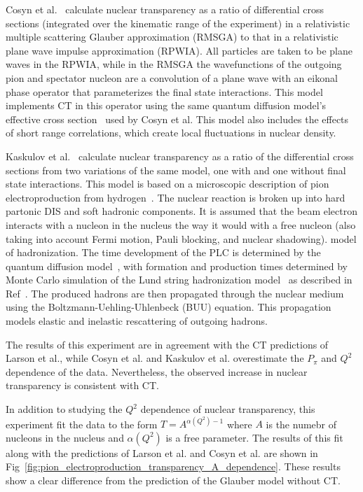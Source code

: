 Cosyn et al.~\cite{Cosyn_2008} calculate nuclear transparency as a ratio of
differential cross sections (integrated over the kinematic range of the
experiment) in a relativistic multiple scattering Glauber approximation (RMSGA)
to that in a relativistic plane wave impulse approximation (RPWIA).
All particles are taken to be plane waves in the RPWIA, while in the RMSGA
the wavefunctions of the outgoing pion and spectator nucleon are a convolution
of a plane wave with an eikonal phase operator that parameterizes the final
state interactions.
This model implements CT in this operator using the same quantum
diffusion model's effective cross section~\cite{Farrar_1988} used by Cosyn et
al.
This model also includes the effects of short range correlations, which create
local fluctuations in nuclear density.


Kaskulov et al.~\cite{Kaskulov_2009, Kaskulov_2012} calculate nuclear
transparency as a ratio of the differential cross sections from two variations
of the same model, one with and one without final state interactions.
This model is based on a microscopic description of pion
electroproduction from hydrogen~\cite{Kaskulov_2008}.
The nuclear reaction is broken up into hard partonic DIS and soft hadronic components.
It is assumed that the beam electron interacts with a
nucleon in the nucleus the way it would with a free nucleon (also taking into
account Fermi motion, Pauli blocking, and nuclear shadowing).
model of hadronization.
The time development of the PLC is determined by the quantum diffusion
model~\cite{Farrar_1988}, with formation and production times determined by
Monte Carlo simulation of the Lund string hadronization
model~\cite{Anderson_1983} as described in Ref~\cite{Gallmeister_2005}.
The produced hadrons are then propagated through the nuclear medium using the
Boltzmann-Uehling-Uhlenbeck (BUU) equation.
This propagation models elastic and inelastic rescattering of outgoing hadrons.


The results of this experiment are in agreement with the CT predictions of
Larson et al., while Cosyn et al. and Kaskulov et al. overestimate the $P_\pi$
and $Q^2$ dependence of the data.
Nevertheless, the observed increase in nuclear transparency is consistent with
CT.


In addition to studying the $Q^2$ dependence of nuclear transparency, this
experiment fit the data to the form $T=A^{\alpha(Q^2)-1}$ where $A$ is the
numebr of nucleons in the nucleus and $\alpha(Q^2)$ is a free parameter.
The results of this fit along with the predictions of Larson et al. and Cosyn et
al. are shown in Fig~\ref{fig:pion_electroproduction_transparency_A_dependence}.
These results show a clear difference from the prediction of the Glauber model
without CT.

